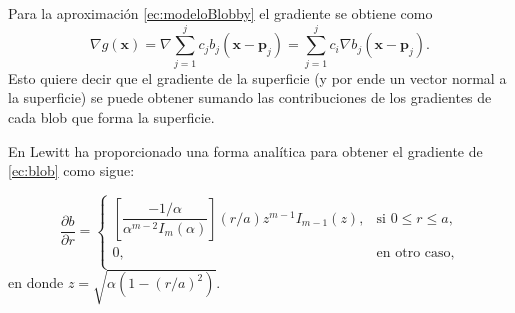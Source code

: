 Para la aproximación \eqref{ec:modeloBlobby} el gradiente se obtiene como
\begin{equation}
\nabla g (\textbf{x}) = \nabla \sum \limits_{j = 1}^{j} c_j b_j(\textbf{x} - \textbf{p}_j) = \sum \limits_{j = 1}^{j} c_i \nabla b_j(\textbf{x} - \textbf{p}_j).
 \label{ec:modBlobbyGradiente}
\end{equation}
Esto quiere decir que el gradiente de la superficie (y por ende un vector normal a la superficie) se puede obtener sumando las contribuciones de los gradientes de cada blob que forma la superficie.
 

En \cite{BlobsMate} Lewitt ha proporcionado una forma analítica para obtener el gradiente de \eqref{ec:blob} como sigue:

\begin{equation}
  \frac{\partial b}{\partial r} = 
    \begin{cases} 
      \left[ \dfrac{-1 / \alpha }{\alpha^{m - 2} I_{m}(\alpha)} \right] (r / a) z^{m - 1} I_{m - 1}(z), & \text{si $0 \leq r \leq a$,} \\
      0, & \text{en otro caso,} \\                                
    \end{cases}
\label{ec:blobGradient}
\end{equation}
en donde $z = \sqrt{\alpha (1 - (r / a)^2)}$.

